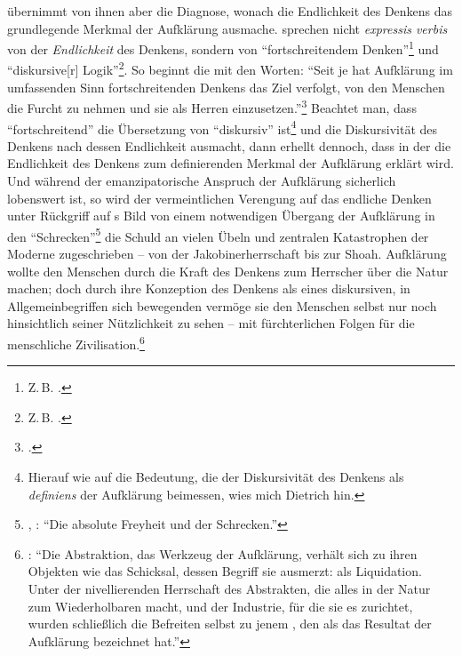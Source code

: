  übernimmt von ihnen aber die Diagnose, wonach die
Endlichkeit des Denkens das grundlegende Merkmal der Aufklärung ausmache.
 sprechen nicht
\emph{expressis verbis} von der \emph{Endlichkeit} des Denkens, sondern von
\enquote{fortschreitendem Denken}\footnote{Z.\,B. \cite[][19,
41]{Horkheimer:DialektikderAufklaerung1997}.} und \enquote{diskursive[r]
Logik}\footnote{Z.\,B. \cite[][26,
30]{Horkheimer:DialektikderAufklaerung1997}.}. So
beginnt die  mit den Worten: \enquote{Seit je
hat Aufklärung im umfassenden Sinn fortschreitenden Denkens das Ziel verfolgt,
von den Menschen die Furcht zu nehmen und sie als Herren
einzusetzen.}\footcite[][19]{Horkheimer:DialektikderAufklaerung1997} Beachtet man, dass
\enquote{fortschreitend} die Übersetzung von \enquote{diskursiv}
ist\footnote{Hierauf wie auf die Bedeutung, die
 der Diskursivität des
Denkens als \emph{definiens} der Aufklärung beimessen, wies mich Dietrich
 hin.} und die Diskursivität des Denkens nach
 dessen Endlichkeit ausmacht, dann erhellt dennoch, dass in
der  die Endlichkeit des Denkens zum definierenden
Merkmal der Aufklärung erklärt wird. Und während der emanzipatorische Anspruch
der Aufklärung sicherlich lobenswert ist, so wird der vermeintlichen Verengung
auf das endliche Denken unter Rückgriff auf s
Bild von einem notwendigen Übergang der Aufklärung in den
\enquote{Schrecken}\footnote{\cite[Vgl.][533]{Hegel:PhaenomenologiedesGeistes1980},
\cite[][IX: 316.10--11]{Hegel:GesammelteWerke}: \enquote{Die absolute Freyheit
und der Schrecken.}} die Schuld an vielen Übeln und zentralen Katastrophen der
Moderne zugeschrieben -- von der Jakobinerherrschaft bis zur Shoah.
Aufklärung wollte den Menschen durch die Kraft des Denkens zum Herrscher über
die Natur machen; doch durch ihre Konzeption des Denkens als eines diskursiven,
in Allgemeinbegriffen sich bewegenden vermöge sie den Menschen selbst nur noch
hinsichtlich seiner Nützlichkeit zu sehen -- mit fürchterlichen Folgen für die
menschliche
Zivilisation.\footnote{\cite[Vgl.][29]{Horkheimer:DialektikderAufklaerung1997}:
\enquote{Die Abstraktion, das Werkzeug der Aufklärung, verhält sich zu ihren
Objekten wie das Schicksal, dessen Begriff sie ausmerzt: als Liquidation. Unter
der nivellierenden Herrschaft des Abstrakten, die alles in der Natur zum
Wiederholbaren macht, und der Industrie, für die sie es zurichtet, wurden
schließlich die Befreiten selbst zu jenem , den
 als das Resultat der Aufklärung bezeichnet
hat.}}



